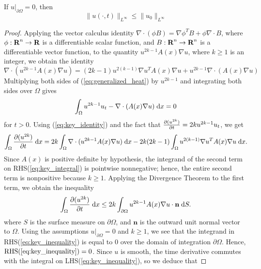 \documentclass{homework}
\begin{document}
	 
	\begin{enumerate}[label=\textbf{(\roman*)}]
	 	\questionpart If $u\big\vert_{\partial\Omega} = 0$, then
	 	\begin{equation}
	 		\lVert u(\cdot, t) \rVert_{L^\infty} \le \lVert u_0\rVert_{L^\infty}
	 	\end{equation}
 		\begin{proof}
	 		Applying the vector calculus identity $\nabla \cdot (\phi B) = \nabla \phi^T B + \phi\nabla \cdot B$, where $\phi : \textbf{R}^n \to \textbf{R}$ is a differentiable scalar function, and $B : \textbf{R}^n \to \textbf{R}^n$ is a differentiable vector function, to the quantity $u^{2k-1}A(x)\nabla u$, where $k \ge 1$ is an integer, we obtain the identity
	 		\begin{equation}
	 			\label{eq:key_identity}
	 			\nabla\cdot(u^{2k-1}A(x)\nabla u) = (2k-1)u^{2(k-1)}\nabla u^TA(x)\nabla u + u^{2k-1}\nabla\cdot(A(x)\nabla u)
	 		\end{equation}
	 		Multiplying both sides of (\ref{eq:generalized_heat}) by $u^{2k-1}$ and integrating both sides over $\Omega$ gives
	 		\begin{equation}
	 			\int_\Omega u^{2k-1}u_t - \nabla \cdot (A(x)\nabla u) \;\text{d} x = 0
	 		\end{equation}
	 		for $t > 0$. Using (\ref{eq:key_identity}) and the fact that $\frac{\partial (u^{2k})}{\partial t} = 2ku^{2k-1}u_t$, we get
	 		\begin{equation}
	 			\label{eq:key_integral}
	 			\int_\Omega \frac{\partial (u^{2k})}{\partial t} \;\text{d} x = 2k\int_\Omega \nabla\cdot(u^{2k-1}A(x)\nabla u)\;\text{d} x - 2k(2k-1)\int_\Omega u^{2(k-1)}\nabla u^TA(x)\nabla u \;\text{d} x.
	 		\end{equation}
			Since $A(x)$ is positive definite by hypothesis, the integrand of the second term on RHS(\ref{eq:key_integral}) is pointwise nonnegative; hence, the entire second term is nonpositive because $k \ge 1$. Applying the Divergence Theorem to the first term, we obtain the inequality
			\begin{equation}
				\label{eq:key_inequality}
				\int_\Omega \frac{\partial (u^{2k})}{\partial t} \;\text{d} x \le 2k \int_{\partial\Omega} u^{2k-1}A(x)\nabla u\cdot \textbf{n} \;\text{d} S.
			\end{equation}
			where $S$ is the surface measure on $\partial \Omega$, and $\textbf{n}$ is the outward unit normal vector to $\Omega$. Using the assumptions $u\big\vert_{\partial\Omega} = 0$ and $k \ge 1$, we see that the integrand in RHS(\ref{eq:key_inequality}) is equal to 0 over the domain of integration $\partial \Omega$. Hence, $\text{RHS}(\ref{eq:key_inequality}) = 0$. Since $u$ is smooth, the time derivative commutes with the integral on LHS(\ref{eq:key_inequality}), so we deduce that

\end{proof}
\end{enumerate}
\end{document}
